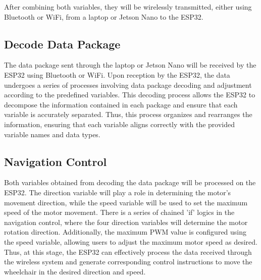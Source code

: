 After combining both variables, they will be wirelessly transmitted, either using Bluetooth or WiFi, from a laptop or Jetson Nano to the ESP32.

\subsection{Decode Data Package}
The data package sent through the laptop or Jetson Nano will be received by the ESP32 using Bluetooth or WiFi. Upon reception by the ESP32, the data undergoes a series of processes involving data package decoding and adjustment according to the predefined variables. This decoding process allows the ESP32 to decompose the information contained in each package and ensure that each variable is accurately separated. Thus, this process organizes and rearranges the information, ensuring that each variable aligns correctly with the provided variable names and data types.

\subsection{Navigation Control}
Both variables obtained from decoding the data package will be processed on the ESP32. The direction variable will play a role in determining the motor's movement direction, while the speed variable will be used to set the maximum speed of the motor movement. There is a series of chained 'if' logics in the navigation control, where the four direction variables will determine the motor rotation direction. Additionally, the maximum PWM value is configured using the speed variable, allowing users to adjust the maximum motor speed as desired. Thus, at this stage, the ESP32 can effectively process the data received through the wireless system and generate corresponding control instructions to move the wheelchair in the desired direction and speed.